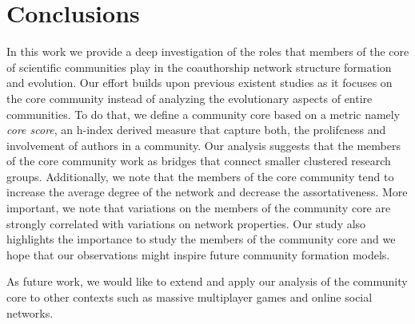 
\section{Conclusions}

In this work we provide a deep investigation of the roles that members of the core of scientific communities play in the coauthorship network structure formation and evolution.
Our effort builds upon previous existent studies as it focuses on the core community instead of analyzing the evolutionary aspects of entire communities.  To do that, we define a
community core based on a metric namely \textit{core score}, an h-index derived measure that capture both, the prolifcness and involvement of authors in a community. Our analysis
suggests that the members of the core community work as bridges that connect smaller clustered research groups. Additionally, we note that the members of the core community tend to
increase the average degree of the network and decrease the assortativeness. More important, we note that variations on the members of the community core are strongly correlated
with variations on network properties.  Our study also highlights the importance to study the members of the community core and we hope that our observations might inspire future
community formation models.

As future work, we would like to extend and apply our analysis of the community core to other contexts such as massive multiplayer games and online social networks.



